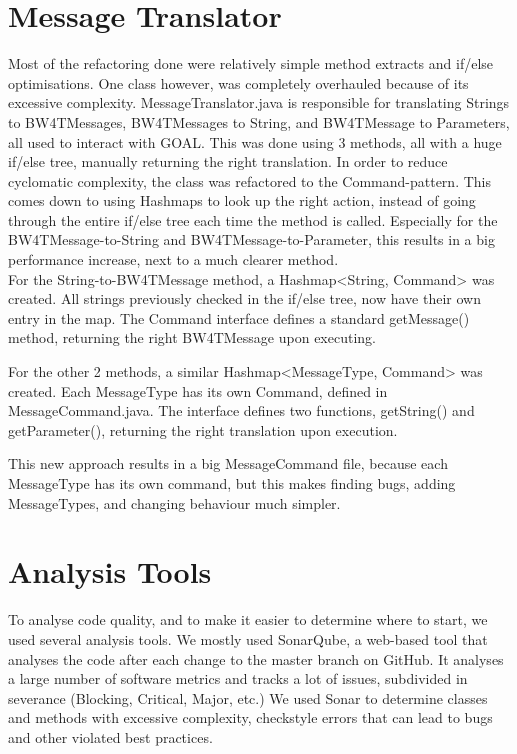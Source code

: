 \section{Message Translator}
Most of the refactoring done were relatively simple method extracts and if/else optimisations. One class however, was completely overhauled because of its excessive complexity. MessageTranslator.java is responsible for translating Strings to BW4TMessages, BW4TMessages to String, and BW4TMessage to Parameters, all used to interact with GOAL. This was done using 3 methods, all with a huge if/else tree, manually returning the right translation. In order to reduce cyclomatic complexity, the class was refactored to the Command-pattern. This comes down to using Hashmaps to look up the right action, instead of going through the entire if/else tree each time the method is called. Especially for the BW4TMessage-to-String and BW4TMessage-to-Parameter, this results in a big performance increase, next to a much clearer method. \\

For the String-to-BW4TMessage method, a Hashmap<String, Command> was created. All strings previously checked in the if/else tree, now have their own entry in the map. The Command interface defines a standard getMessage() method, returning the right BW4TMessage upon executing. 

For the other 2 methods, a similar Hashmap<MessageType, Command> was created. Each MessageType has its own Command, defined in MessageCommand.java. The interface defines two functions, getString() and getParameter(), returning the right translation upon execution. 

This new approach results in a big MessageCommand file, because each MessageType has its own command, but this makes finding bugs, adding MessageTypes, and changing behaviour much simpler.

\section{Analysis Tools}
To analyse code quality, and to make it easier to determine where to start, we used several analysis tools. We mostly used SonarQube, a web-based tool that analyses the code after each change to the master branch on GitHub. It analyses a large number of software metrics and tracks a lot of issues, subdivided in severance (Blocking, Critical, Major, etc.) We used Sonar to determine classes and methods with excessive complexity, checkstyle errors that can lead to bugs and other violated best practices. 